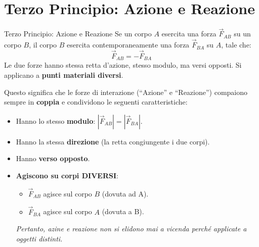 \section{Terzo Principio: Azione e Reazione}
\begin{definizione}{Terzo Principio: Azione e Reazione}
Se un corpo $A$ esercita una forza $\vec{F}_{AB}$ su un corpo $B$, il corpo $B$ esercita contemporaneamente una forza $\vec{F}_{BA}$ su $A$, tale che:
\begin{equation}
    \vec{F}_{AB} = -\vec{F}_{BA}
\end{equation}
Le due forze hanno stessa retta d'azione, stesso modulo, ma versi opposti. Si applicano a \textbf{punti materiali diversi}.
\end{definizione}
Questo significa che le forze di interazione (``Azione'' e ``Reazione'') compaiono sempre in \textbf{coppia} e condividono le seguenti caratteristiche:
\begin{itemize}
    \item Hanno lo stesso \textbf{modulo}: $|\vec{F}_{AB}| = |\vec{F}_{BA}|$.
    \item Hanno la stessa \textbf{direzione} (la retta congiungente i due corpi).
    \item Hanno \textbf{verso opposto}.
    \item \textbf{Agiscono su corpi DIVERSI}:
    \begin{itemize}
        \item $\vec{F}_{AB}$ agisce sul corpo $B$ (dovuta ad A).
        \item $\vec{F}_{BA}$ agisce sul corpo $A$ (dovuta a B).
    \end{itemize}
    \textit{Pertanto, azine e reazione non si elidono mai a vicenda perché applicate a oggetti distinti.}
\end{itemize}

